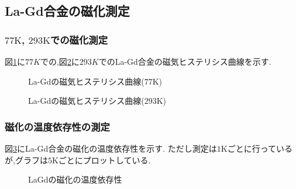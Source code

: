\subsection{La-Gd合金の磁化測定}
\subsubsection{$77\si{\kelvin}$, $293\si{\kelvin}$での磁化測定}
図\ref{fig:LaGd_hysteresis_77K}に$77K$での,図\ref{fig:LaGd_hysteresis_293K}に$293K$でのLa-Gd合金の磁気ヒステリシス曲線を示す.
\begin{figure}[hptb]
  \begin{center}
    
    \caption{La-Gdの磁気ヒステリシス曲線($77\si{\kelvin}$)}
    \label{fig:LaGd_hysteresis_77K}
  \end{center}
\end{figure}
\begin{figure}[hptb]
  \begin{center}
    
    \caption{La-Gdの磁気ヒステリシス曲線($293\si{\kelvin}$)}
    \label{fig:LaGd_hysteresis_293K}
  \end{center}
\end{figure}
\newpage
\subsubsection{磁化の温度依存性の測定}
図\ref{fig:LaGd_J-Temp}にLa-Gd合金の磁化の温度依存性を示す.
ただし測定は$1\si{\kelvin}$ごとに行っているが,グラフは$5\si{\kelvin}$ごとにプロットしている.
\begin{figure}[hptb]
  \begin{center}
    
    \caption{LaGdの磁化の温度依存性}
    \label{fig:LaGd_J-Temp}
  \end{center}
\end{figure}
%    
%
%    
